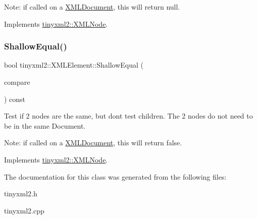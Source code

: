 Note\+: if called on a \mbox{\hyperlink{classtinyxml2_1_1_x_m_l_document}{X\+M\+L\+Document}}, this will return null. 

Implements \mbox{\hyperlink{classtinyxml2_1_1_x_m_l_node_a8402cbd3129d20e9e6024bbcc0531283}{tinyxml2\+::\+X\+M\+L\+Node}}.

\mbox{\label{classtinyxml2_1_1_x_m_l_element_a61ffd7bf918a9db4aa6203d855ac5ec2}} 
\subsubsection{\texorpdfstring{ShallowEqual()}{ShallowEqual()}}
{\footnotesize\ttfamily bool tinyxml2\+::\+X\+M\+L\+Element\+::\+Shallow\+Equal (\begin{DoxyParamCaption}\item[{const \mbox{\hyperlink{classtinyxml2_1_1_x_m_l_node}{X\+M\+L\+Node}} $\ast$}]{compare }\end{DoxyParamCaption}) const\hspace{0.3cm}{\ttfamily [virtual]}}

Test if 2 nodes are the same, but don\textquotesingle{}t test children. The 2 nodes do not need to be in the same Document.

Note\+: if called on a \mbox{\hyperlink{classtinyxml2_1_1_x_m_l_document}{X\+M\+L\+Document}}, this will return false. 

Implements \mbox{\hyperlink{classtinyxml2_1_1_x_m_l_node_a7ce18b751c3ea09eac292dca264f9226}{tinyxml2\+::\+X\+M\+L\+Node}}.



The documentation for this class was generated from the following files\+:\begin{DoxyCompactItemize}
\item 
tinyxml2.\+h\item 
tinyxml2.\+cpp\end{DoxyCompactItemize}
